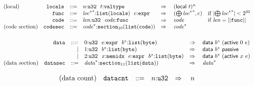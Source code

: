 $$
\begin{array}[t]{@{}lrrl@{}l@{}l@{}l@{}}
\mbox{(local)} & {\mathtt{locals}} & ::= & n{:}{\mathtt{u32}}~~t{:}{\mathtt{valtype}} & \quad\Rightarrow\quad{} & {(\mathsf{local}~t)^{n}} \\
& {\mathtt{func}} & ::= & {{{\mathit{loc}}^\ast}^\ast}{:}{\mathtt{list}}({\mathtt{locals}})~~e{:}{\mathtt{expr}} & \quad\Rightarrow\quad{} & ({\bigoplus}\, {{{\mathit{loc}}^\ast}^\ast}, e) & \quad \mbox{if}~ {|{\bigoplus}\, {{{\mathit{loc}}^\ast}^\ast}|} < {2^{32}} \\
& {\mathtt{code}} & ::= & {\mathit{len}}{:}{\mathtt{u32}}~~{\mathit{code}}{:}{\mathtt{func}} & \quad\Rightarrow\quad{} & {\mathit{code}} & \quad \mbox{if}~ {\mathit{len}} = ||{\mathtt{func}}|| \\
\mbox{(code section)} & {\mathtt{codesec}} & ::= & {{\mathit{code}}^\ast}{:}{{\mathtt{section}}}_{10}({\mathtt{list}}({\mathtt{code}})) & \quad\Rightarrow\quad{} & {{\mathit{code}}^\ast} \\
\end{array}
$$

\vspace{1ex}

$$
\begin{array}[t]{@{}lrrl@{}l@{}l@{}l@{}}
& {\mathtt{data}} & ::= & 0{:}{\mathtt{u32}}~~e{:}{\mathtt{expr}}~~{b^\ast}{:}{\mathtt{list}}({\mathtt{byte}}) & \quad\Rightarrow\quad{} & \mathsf{data}~{b^\ast}~(\mathsf{active}~0~e) \\
& & | & 1{:}{\mathtt{u32}}~~{b^\ast}{:}{\mathtt{list}}({\mathtt{byte}}) & \quad\Rightarrow\quad{} & \mathsf{data}~{b^\ast}~\mathsf{passive} \\
& & | & 2{:}{\mathtt{u32}}~~x{:}{\mathtt{memidx}}~~e{:}{\mathtt{expr}}~~{b^\ast}{:}{\mathtt{list}}({\mathtt{byte}}) & \quad\Rightarrow\quad{} & \mathsf{data}~{b^\ast}~(\mathsf{active}~x~e) \\
\mbox{(data section)} & {\mathtt{datasec}} & ::= & {{\mathit{data}}^\ast}{:}{{\mathtt{section}}}_{11}({\mathtt{list}}({\mathtt{data}})) & \quad\Rightarrow\quad{} & {{\mathit{data}}^\ast} \\
\end{array}
$$

\vspace{1ex}

$$
\begin{array}[t]{@{}lrrl@{}l@{}l@{}l@{}}
\mbox{(data count)} & {\mathtt{datacnt}} & ::= & n{:}{\mathtt{u32}} & \quad\Rightarrow\quad{} & n \\
\end{array}
$$

